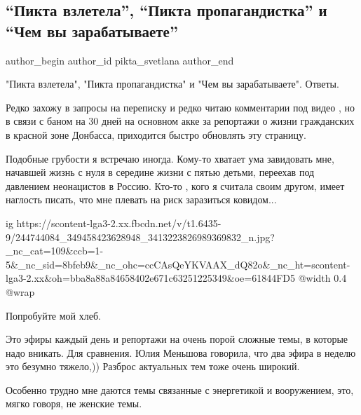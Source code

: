 
 
 
 
 
 
\subsection{\enquote{Пикта взлетела}, \enquote{Пикта пропагандистка} и \enquote{Чем вы зарабатываете}}
\label{sec:08_10_2021.fb.pikta_svetlana.1.pikta_rusmir_zhizn}
 
\ifcmt
 author_begin
   author_id pikta_svetlana
 author_end
\fi

"Пикта взлетела", "Пикта пропагандистка" и "Чем вы зарабатываете". Ответы. 

Редко захожу в запросы на переписку и редко читаю комментарии под видео ,  но в
связи с баном на 30 дней на основном акке за репортажи о жизни гражданских в
красной зоне  Донбасса, приходится быстро обновлять эту страницу. 

Подобные грубости я встречаю иногда. Кому-то хватает ума завидовать мне,
начавшей жизнь с нуля в середине жизни с пятью детьми, переехав под давлением
неонацистов в Россию. Кто-то , кого я считала своим другом, имеет наглость
писать, что мне плевать на риск заразиться ковидом... 

\ifcmt
  ig https://scontent-lga3-2.xx.fbcdn.net/v/t1.6435-9/244744084_349458423628948_3413223826989369832_n.jpg?_nc_cat=109&ccb=1-5&_nc_sid=8bfeb9&_nc_ohc=ccCAsQeYKVAAX_dQ82o&_nc_ht=scontent-lga3-2.xx&oh=bba8a88a84658402e671c63251225349&oe=61844FD5
  @width 0.4
  @wrap 
\fi

Попробуйте мой хлеб.

Это эфиры каждый день и репортажи на очень порой сложные темы, в которые надо
вникать. Для сравнения. Юлия Меньшова говорила, что два эфира в неделю это
безумно тяжело,))  Разброс актуальных тем тоже очень широкий.

Особенно трудно мне даются темы связанные с энергетикой и вооружением, это,
мягко говоря, не женские темы. 

